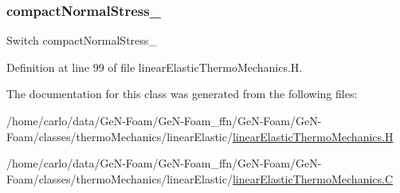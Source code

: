 \mbox{\label{classFoam_1_1linearElasticThermoMechanics_aed5cfa5ed091df9944a6429bd42f5529}} 
\subsubsection{\texorpdfstring{compact\+Normal\+Stress\+\_\+}{compactNormalStress\_}}
{\footnotesize\ttfamily Switch compact\+Normal\+Stress\+\_\+\hspace{0.3cm}{\ttfamily [protected]}}



Definition at line 99 of file linear\+Elastic\+Thermo\+Mechanics.\+H.



The documentation for this class was generated from the following files\+:\begin{DoxyCompactItemize}
\item 
/home/carlo/data/\+Ge\+N-\/\+Foam/\+Ge\+N-\/\+Foam\+\_\+ffn/\+Ge\+N-\/\+Foam/\+Ge\+N-\/\+Foam/classes/thermo\+Mechanics/linear\+Elastic/\hyperlink{linearElasticThermoMechanics_8H}{linear\+Elastic\+Thermo\+Mechanics.\+H}\item 
/home/carlo/data/\+Ge\+N-\/\+Foam/\+Ge\+N-\/\+Foam\+\_\+ffn/\+Ge\+N-\/\+Foam/\+Ge\+N-\/\+Foam/classes/thermo\+Mechanics/linear\+Elastic/\hyperlink{linearElasticThermoMechanics_8C}{linear\+Elastic\+Thermo\+Mechanics.\+C}\end{DoxyCompactItemize}
